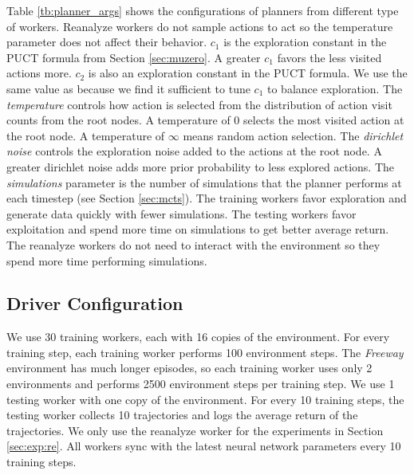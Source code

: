 Table \ref{tb:planner_args} shows the configurations of planners from different type of workers.
Reanalyze workers do not sample actions to act so the temperature parameter does not affect their behavior.
$c_1$ is the exploration constant in the PUCT formula from Section \ref{sec:muzero}.
A greater $c_1$ favors the less visited actions more.
$c_2$ is also an exploration constant in the PUCT formula.
We use the same value as \cite{MasteringAtariGo_Schrittwieser.Antonoglou.ea_2020} because we find it sufficient to tune $c_1$ to balance exploration.
The \textit{temperature} controls how action is selected from the distribution of action visit counts from the root nodes.
A temperature of 0 selects the most visited action at the root node.
A temperature of $\infty$ means random action selection.
The \textit{dirichlet noise} controls the exploration noise added to the actions at the root node.
A greater dirichlet noise adds more prior probability to less explored actions.
The \textit{simulations} parameter is the number of simulations that the planner performs at each timestep (see Section \ref{sec:mcts}).
The training workers favor exploration and generate data quickly with fewer simulations.
The testing workers favor exploitation and spend more time on simulations to get better average return.
The reanalyze workers do not need to interact with the environment so they spend more time performing simulations.

\subsection{Driver Configuration} \label{sec:exp:driver}
We use 30 training workers, each with 16 copies of the environment.
For every training step, each training worker performs 100 environment steps.
The \textit{Freeway} environment has much longer episodes, so each training worker uses only 2 environments and performs 2500 environment steps per training step.
We use 1 testing worker with one copy of the environment.
For every 10 training steps, the testing worker collects 10 trajectories and logs the average return of the trajectories.
We only use the reanalyze worker for the experiments in Section \ref{sec:exp:re}.
All workers sync with the latest neural network parameters every 10 training steps.


